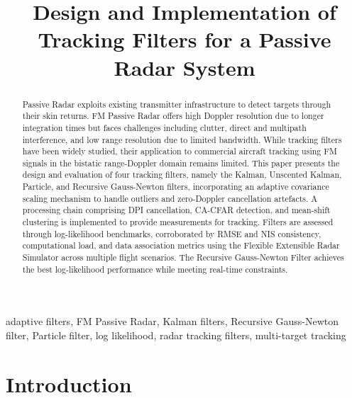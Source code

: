 \documentclass[conference]{IEEEtran}
\begin{document}
\title{Design and Implementation of Tracking Filters for a Passive Radar System}

\author{
}

\maketitle

\begin{abstract}
Passive Radar exploits existing transmitter infrastructure to detect targets through their skin returns. FM Passive Radar offers high Doppler resolution due to longer integration times but faces challenges including clutter, direct and multipath interference, and low range resolution due to limited bandwidth. While tracking filters have been widely studied, their application to commercial aircraft tracking using FM signals in the bistatic range-Doppler domain remains limited. This paper presents the design and evaluation of four tracking filters, namely the Kalman, Unscented Kalman, Particle, and Recursive Gauss-Newton filters, incorporating an adaptive covariance scaling mechanism to handle outliers and zero-Doppler cancellation artefacts. A processing chain comprising DPI cancellation, CA-CFAR detection, and mean-shift clustering is implemented to provide measurements for tracking. Filters are assessed through log-likelihood benchmarks, corroborated by RMSE and NIS consistency, computational load, and data association metrics using the Flexible Extensible Radar Simulator across multiple flight scenarios. The Recursive Gauss-Newton Filter achieves the best log-likelihood performance while meeting real-time constraints.
\end{abstract}

\begin{IEEEkeywords}
adaptive filters, FM Passive Radar, Kalman filters, Recursive Gauss-Newton filter, Particle filter, log likelihood, radar tracking filters, multi-target tracking
\end{IEEEkeywords}

\section{Introduction}
\end{document}
